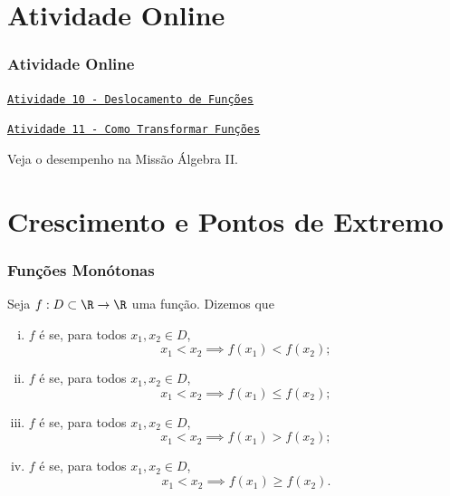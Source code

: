\documentclass[brazil, notheorems, 10pt]{beamer}
\begin{document}
\section{Atividade Online}
\begin{frame}
\frametitle{Atividade Online} %

\href{https://pt.khanacademy.org/math/algebra2/manipulating-functions/shifting-functions/e/shift-functions}
{{\tt Atividade 10 - Deslocamento de Funções}}

\href{https://pt.khanacademy.org/math/algebra2/manipulating-functions/stretching-functions/e/shifting_and_reflecting_functions}
{{\tt Atividade 11 - Como Transformar Funções}}


Veja o desempenho na Missão Álgebra II.


\end{frame}



\section{Crescimento e Pontos de Extremo}
\begin{frame}
\frametitle{Funções Monótonas} %

\begin{definicao}\label{funcmon}
Seja $f: D \subset \R \to \R$ uma função. Dizemos que
\begin{enumerate}[(i)]
	\item $f$ é  se, para todos $x_1, x_2 \in D$,
	$$x_1 < x_2 \implies f(x_1) < f(x_2);$$
	\item $f$ é  se, para todos $x_1, x_2 \in D$,
	$$x_1 < x_2 \implies f(x_1) \leq f(x_2);$$
	\item $f$ é  se, para todos $x_1, x_2 \in D$,
	$$x_1 < x_2 \implies f(x_1) > f(x_2);$$
	\item $f$ é  se, para todos $x_1, x_2 \in D$,
	$$x_1 < x_2 \implies f(x_1) \geq f(x_2).$$%
\end{enumerate}
\end{definicao}

\end{frame}
\end{document}
